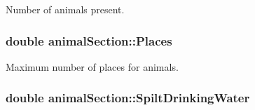 Number of animals present. \hypertarget{classanimal_section_a6dec38054e731fa71041f934f12897b7}{
\subsubsection[{Places}]{\setlength{\rightskip}{0pt plus 5cm}double {\bf animalSection::Places}}}
\label{classanimal_section_a6dec38054e731fa71041f934f12897b7}


Maximum number of places for animals. \hypertarget{classanimal_section_ab89ee53e426cd797b752f65669b2bde2}{
\subsubsection[{SpiltDrinkingWater}]{\setlength{\rightskip}{0pt plus 5cm}double {\bf animalSection::SpiltDrinkingWater}}}
\label{classanimal_section_ab89ee53e426cd797b752f65669b2bde2}


